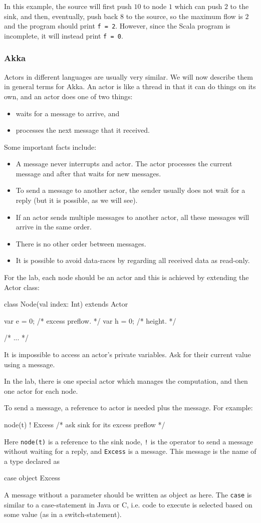\documentclass{forsete}
\begin{document}
{In this example, the source will first push $10$ to node $1$ which can push $2$ to the sink, and then, eventually,
push back $8$ to the source, so the maximum flow is $2$ and the program should print {\tt f = 2}.
However, since the Scala program is incomplete, it will instead print {\tt f = 0}.

\subsubsection*{Akka}
Actors in different languages are usually very similar. We will now describe them in general terms for Akka.
An actor is like a thread in that it can do things on its own, and an actor does one of two things:
\begin{itemize}
\item waits for a message to arrive, and
\item processes the next message that it received.
\end{itemize}
Some important facts include:
\begin{itemize}
\item A message never interrupts and actor. The actor processes the current message and after that waits for new
messages.
\item To send a message to another actor, the sender usually does not wait for a reply (but it is possible, as we will see).
\item If an actor sends multiple messages to another actor, all these messages will arrive in the same order. 
\item There is no other order between messages.
\item It is possible to avoid data-races by regarding all received data as read-only.
\end{itemize}
For the lab, each node should be an actor and this is achieved by extending the Actor class:
\begin{ccode}
class Node(val index: Int) extends Actor {
	var	e = 0;				/* excess preflow. 						*/
	var	h = 0;				/* height. 							*/
   
        /* ... */
}
\end{ccode}

It is impossible to access an actor's private variables. Ask for their current value using a message.

In the lab, there is one special actor which manages the computation, and then one actor for each node.

To send a message, a reference to actor is needed plus the message. For example:
\begin{ccode}
node(t) ! Excess	/* ask sink for its excess preflow */
\end{ccode}
Here {\tt node(t)} is a reference to the sink node, \verb.!. is the operator to send a message without 
waiting for a reply, and \verb.Excess. is a message. This message is the name of a type declared as
\begin{ccode}
case object Excess
\end{ccode}
A message without a parameter should be written as object as here. The \verb.case. is similar to 
a case-statement in Java or C, i.e. code to execute is selected based on some value (as in a switch-statement).

}
\end{document}
